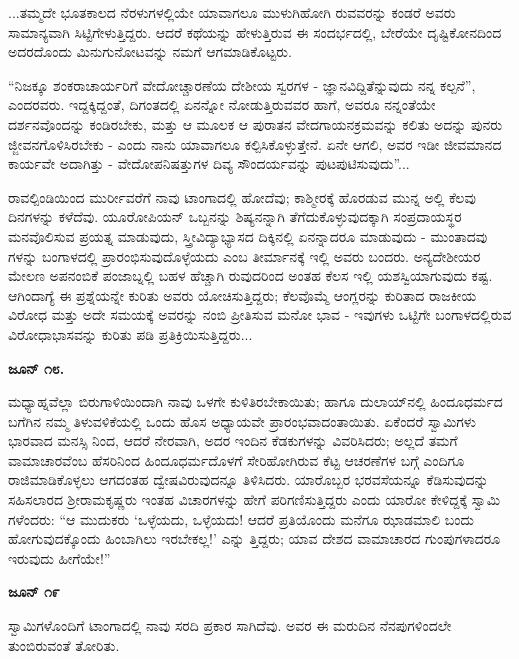 ...ತಮ್ಮದೇ ಭೂತಕಾಲದ ನೆರಳುಗಳಲ್ಲಿಯೇ ಯಾವಾಗಲೂ ಮುಳುಗಿಹೋಗಿ ರುವವರನ್ನು ಕಂಡರೆ ಅವರು ಸಾಮಾನ್ಯವಾಗಿ ಸಿಟ್ಟಿಗೇಳುತ್ತಿದ್ದರು. ಆದರೆ ಕಥೆಯನ್ನು ಹೇಳುತ್ತಿರುವ ಈ ಸಂದರ್ಭದಲ್ಲಿ, ಬೇರೆಯೇ ದೃಷ್ಟಿಕೋನದಿಂದ ಅದರದೊಂದು ಮಿನುಗುನೋಟವನ್ನು ನಮಗೆ ಆಗಮಾಡಿಕೊಟ್ಟರು.

“ನಿಜಕ್ಕೂ ಶಂಕರಾಚಾರ್ಯರಿಗೆ ವೇದೋಚ್ಚಾರಣೆಯ ದೇಶೀಯ ಸ್ವರಗಳ - ಜ್ಞಾನವಿದ್ದಿತೆನ್ನುವುದು ನನ್ನ ಕಲ್ಪನೆ”, ಎಂದರವರು. ಇದ್ದಕ್ಕಿದ್ದಂತೆ, ದಿಗಂತದಲ್ಲಿ ಏನನ್ನೋ ನೋಡುತ್ತಿರುವವರ ಹಾಗೆ, ಅವರೂ ನನ್ನಂತೆಯೇ ದರ್ಶನವೊಂದನ್ನು ಕಂಡಿರಬೇಕು, ಮತ್ತು ಆ ಮೂಲಕ ಆ ಪುರಾತನ ವೇದಗಾಯನಕ್ರಮವನ್ನು ಕಲಿತು ಅದನ್ನು ಪುನರು ಜ್ಜೀವನಗೊಳಿಸಿರಬೇಕು - ಎಂದು ನಾನು ಯಾವಾಗಲೂ ಕಲ್ಪಿಸಿಕೊಳ್ಳುತ್ತೇನೆ. ಏನೇ ಆಗಲಿ, ಅವರ ಇಡೀ ಜೀವಮಾನದ ಕಾರ್ಯವೇ ಅದಾಗಿತ್ತು - ವೇದೋಪನಿಷತ್ತುಗಳ ದಿವ್ಯ ಸೌಂದರ್ಯವನ್ನು ಪುಟಪುಟಿಸುವುದು”...

ರಾವಲ್ಪಿಂಡಿಯಿಂದ ಮುರ್ರೀವರೆಗೆ ನಾವು ಟಾಂಗಾದಲ್ಲಿ ಹೋದೆವು; ಕಾಶ್ಮೀರಕ್ಕೆ ಹೊರಡುವ ಮುನ್ನ ಅಲ್ಲಿ ಕೆಲವು ದಿನಗಳನ್ನು ಕಳೆದೆವು. ಯೂರೋಪಿಯನ್ ಒಬ್ಬನನ್ನು ಶಿಷ್ಯನನ್ನಾಗಿ ತೆಗೆದುಕೊಳ್ಳುವುದಕ್ಕಾಗಿ ಸಂಪ್ರದಾಯಸ್ಥರ ಮನವೊಲಿಸುವ ಪ್ರಯತ್ನ ಮಾಡುವುದು, ಸ್ತ್ರೀವಿದ್ಯಾಭ್ಯಾಸದ ದಿಕ್ಕಿನಲ್ಲಿ ಏನನ್ನಾದರೂ ಮಾಡುವುದು - ಮುಂತಾದವು ಗಳನ್ನು ಬಂಗಾಳದಲ್ಲಿ ಪ್ರಾರಂಭಿಸುವುದೊಳ್ಳೆಯದು ಎಂಬ ತೀರ್ಮಾನಕ್ಕೆ ಇಲ್ಲಿ ಅವರು ಬಂದರು. ಅನ್ಯದೇಶೀಯರ ಮೇಲಣ ಅಪನಂಬಿಕೆ ಪಂಜಾಬ್ನಲ್ಲಿ ಬಹಳ ಹೆಚ್ಚಾಗಿ ರುವುದರಿಂದ ಅಂತಹ ಕೆಲಸ ಇಲ್ಲಿ ಯಶಸ್ವಿಯಾಗುವುದು ಕಷ್ಟ. ಆಗಿಂದಾಗ್ಯೆ ಈ ಪ್ರಶ್ನೆಯನ್ನೇ ಕುರಿತು ಅವರು ಯೋಚಿಸುತ್ತಿದ್ದರು; ಕೆಲವೊಮ್ಮೆ ಆಂಗ್ಲರನ್ನು ಕುರಿತಾದ ರಾಜಕೀಯ ವಿರೋಧ ಮತ್ತು ಅದೇ ಸಮಯಕ್ಕೆ ಅವರನ್ನು ನಂಬಿ ಪ್ರೀತಿಸುವ ಮನೋ ಭಾವ - ಇವುಗಳು ಒಟ್ಟಿಗೇ ಬಂಗಾಳದಲ್ಲಿರುವ ವಿರೋಧಾಭಾಸವನ್ನು ಕುರಿತು ಪಡಿ ಪ್ರತಿಕ್ರಿಯಿಸುತ್ತಿದ್ದರು...

\textbf{ಜೂನ್ ೧೮.}

ಮಧ್ಯಾಹ್ನವೆಲ್ಲಾ ಬಿರುಗಾಳಿಯಿಂದಾಗಿ ನಾವು ಒಳಗೇ ಕುಳಿತಿರಬೇಕಾಯಿತು; ಹಾಗೂ ದುಲಾಯ್​ನಲ್ಲಿ ಹಿಂದೂಧರ್ಮದ ಬಗೆಗಿನ ನಮ್ಮ ತಿಳುವಳಿಕೆಯಲ್ಲಿ ಒಂದು ಹೊಸ ಅಧ್ಯಾಯವೇ ಪ್ರಾರಂಭವಾದಂತಾಯಿತು. ಏಕೆಂದರೆ ಸ್ವಾಮಿಗಳು ಭಾರವಾದ ಮನಸ್ಸಿ ನಿಂದ, ಆದರೆ ನೇರವಾಗಿ, ಅದರ ಇಂದಿನ ಕೆಡಕುಗಳನ್ನು ವಿವರಿಸಿದರು; ಅಲ್ಲದೆ ತಮಗೆ ವಾಮಾಚಾರವೆಂಬ ಹೆಸರಿನಿಂದ ಹಿಂದೂಧರ್ಮದೊಳಗೆ ಸೇರಿಹೋಗಿರುವ ಕೆಟ್ಟ ಆಚರಣೆಗಳ ಬಗ್ಗೆ ಎಂದಿಗೂ ರಾಜಿಮಾಡಿಕೊಳ್ಳಲು ಆಗದಂತಹ ದ್ವೇಷವಿರುವುದನ್ನೂ ತಿಳಿಸಿದರು. ಯಾರೊಬ್ಬರ ಭರವಸೆಯನ್ನೂ ಕೆಡಿಸುವುದನ್ನು ಸಹಿಸಲಾರದ ಶ‍್ರೀರಾಮಕೃಷ್ಣರು ಇಂತಹ ವಿಚಾರಗಳನ್ನು ಹೇಗೆ ಪರಿಗಣಿಸುತ್ತಿದ್ದರು ಎಂದು ಯಾರೋ ಕೇಳಿದ್ದಕ್ಕೆ ಸ್ವಾಮಿ ಗಳೆಂದರು: “ಆ ಮುದುಕರು ‘ಒಳ್ಳೆಯದು, ಒಳ್ಳೆಯದು! ಆದರೆ ಪ್ರತಿಯೊಂದು ಮನೆಗೂ ಝಾಡಮಾಲಿ ಬಂದು ಹೋಗುವುದಕ್ಕೊಂದು ಹಿಂಬಾಗಿಲು ಇರಬೇಕಲ್ಲ!’ ಎನ್ನು ತ್ತಿದ್ದರು; ಯಾವ ದೇಶದ ವಾಮಾಚಾರದ ಗುಂಪುಗಳಾದರೂ ಇರುವುದು ಹೀಗೆಯೇ!”

\textbf{ಜೂನ್ ೧೯}

ಸ್ವಾಮಿಗಳೊಂದಿಗೆ ಟಾಂಗಾದಲ್ಲಿ ನಾವು ಸರದಿ ಪ್ರಕಾರ ಸಾಗಿದೆವು. ಅವರ ಈ ಮರುದಿನ ನೆನಪುಗಳಿಂದಲೇ ತುಂಬಿರುವಂತೆ ತೋರಿತು.

